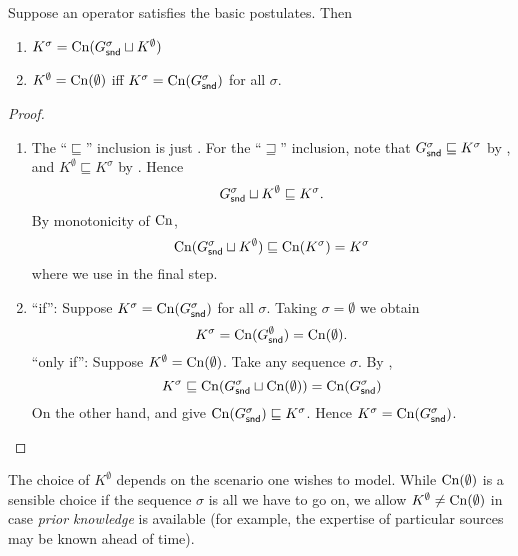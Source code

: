 \begin{proposition}
    \label{kr_prop_prior_knowledge}
    Suppose an operator satisfies the basic postulates. Then
    \begin{enumerate}
        \item $K^\sigma = \operatorname{Cn}(G^\sigma_{\mathsf{snd}} \sqcup K^\emptyset)$
        \item $K^\emptyset = \operatorname{Cn}(\emptyset)$ iff $K^\sigma =
              \operatorname{Cn}(G^\sigma_{\mathsf{snd}})$ for all $\sigma$.
    \end{enumerate}
\end{proposition}

\begin{proof}
    \leavevmode
    \begin{enumerate}
        \item The ``$\sqsubseteq$'' inclusion is just \kbound{}.
              For the ``$\sqsupseteq$'' inclusion, note that $G^\sigma_{\mathsf{snd}}
              \sqsubseteq K^\sigma$ by \soundness{}, and $K^\emptyset
              \sqsubseteq K^\sigma$ by \priorext{}. Hence
              \[
                  G^\sigma_{\mathsf{snd}} \sqcup K^\emptyset
                  \sqsubseteq
                  K^\sigma.
              \]
              By monotonicity of $\operatorname{Cn}$,
              \[
                  \operatorname{Cn}(G^\sigma_{\mathsf{snd}} \sqcup K^\emptyset)
                  \sqsubseteq
                  \operatorname{Cn}(K^\sigma)
                  = K^\sigma
              \]
              where we use \closure{} in the final step.

          \item ``if'': Suppose $K^\sigma = \operatorname{Cn}(G^\sigma_{\mathsf{snd}})$ for all
                $\sigma$. Taking $\sigma = \emptyset$ we obtain
                \[
                    K^\sigma = \operatorname{Cn}(G^\emptyset_{\mathsf{snd}}) = \operatorname{Cn}(\emptyset).
                \]
                ``only if'': Suppose $K^\emptyset = \operatorname{Cn}(\emptyset)$. Take any
                sequence $\sigma$. By \kbound{},
                \[
                    K^\sigma
                    \sqsubseteq \operatorname{Cn}(G^\sigma_{\mathsf{snd}} \sqcup \operatorname{Cn}(\emptyset))
                    = \operatorname{Cn}(G^\sigma_{\mathsf{snd}})
                \]
                On the other hand, \soundness{} and \closure{} give
                $\operatorname{Cn}(G^\sigma_{\mathsf{snd}}) \sqsubseteq K^\sigma$. Hence $K^\sigma =
                \operatorname{Cn}(G^\sigma_{\mathsf{snd}})$.
    \end{enumerate}
\end{proof}

The choice of $K^\emptyset$ depends on the scenario one wishes to model.
While $\operatorname{Cn}(\emptyset)$ is a sensible choice if the sequence $\sigma$ is all we
have to go on, we allow $K^\emptyset \ne \operatorname{Cn}(\emptyset)$ in case \emph{prior
knowledge} is available (for example, the expertise of particular sources may
be known ahead of time).

